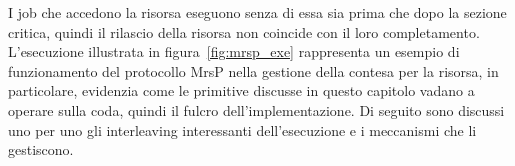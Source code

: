 I job che accedono la risorsa eseguono senza di essa sia prima che dopo la sezione critica, quindi il rilascio della risorsa non coincide con il loro completamento.\\

L'esecuzione illustrata in figura~\ref{fig:mrsp_exe} rappresenta un esempio di funzionamento del protocollo MrsP nella gestione della contesa per la risorsa, in particolare, evidenzia come le primitive discusse in questo capitolo vadano a operare sulla coda, quindi il fulcro dell'implementazione. Di seguito sono discussi uno per uno gli interleaving interessanti dell'esecuzione e i meccanismi che li gestiscono.

\begin{sidewaysfigure}
    \centering
	\mrspExe
    \caption{Attivazione di un agente.}
    \label{fig:mrsp_exe}
\end{sidewaysfigure}

